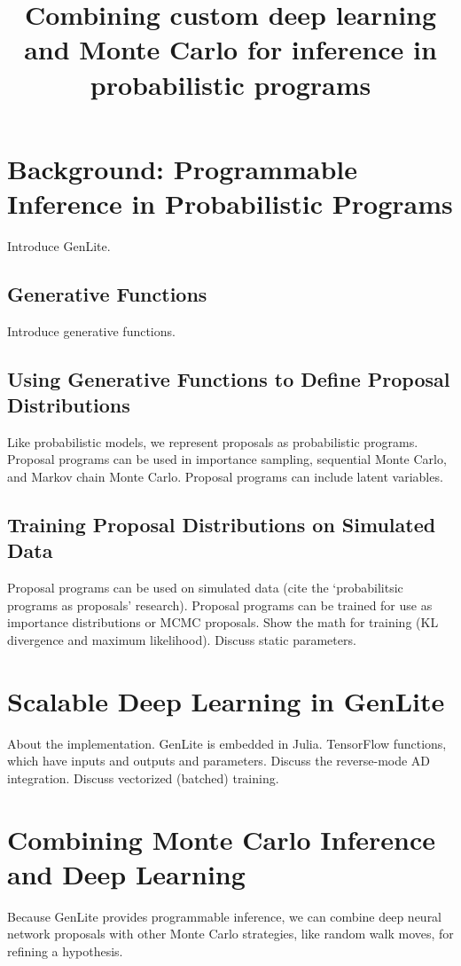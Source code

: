 \documentclass{article}
\title{Combining custom deep learning and Monte Carlo for inference in probabilistic programs}
\begin{document}
\maketitle

\begin{abstract}

\end{abstract}

\section{Background: Programmable Inference in Probabilistic Programs}
Introduce GenLite.

\subsection{Generative Functions}
Introduce generative functions.

\subsection{Using Generative Functions to Define Proposal Distributions}
Like probabilistic models, we represent proposals as probabilistic programs.
Proposal programs can be used in importance sampling, sequential Monte Carlo, and Markov chain Monte Carlo.
Proposal programs can include latent variables.

\subsection{Training Proposal Distributions on Simulated Data}
Proposal programs can be used on simulated data (cite the `probabilitsic programs as proposals' research).
Proposal programs can be trained for use as importance distributions or MCMC proposals.
Show the math for training (KL divergence and maximum likelihood).
Discuss static parameters.

\section{Scalable Deep Learning in GenLite}
About the implementation.
GenLite is embedded in Julia.
TensorFlow functions, which have inputs and outputs and parameters.
Discuss the reverse-mode AD integration.
Discuss vectorized (batched) training.

\section{Combining Monte Carlo Inference and Deep Learning}
Because GenLite provides programmable inference, we can combine deep neural network proposals with other Monte Carlo strategies, like random walk moves, for refining a hypothesis.
\end{document}
